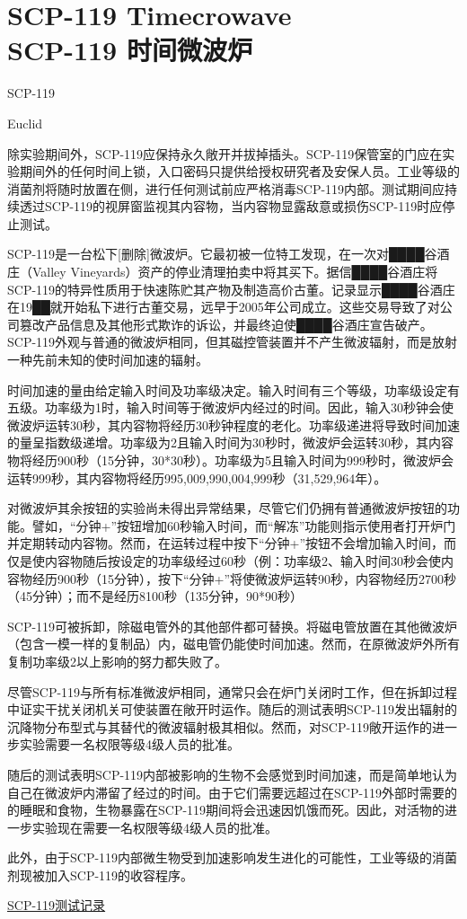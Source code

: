 \chapter[SCP-119 时间微波炉]{
    SCP-119 Timecrowave\\
    SCP-119 时间微波炉
}

\label{chap:SCP-119}

SCP-119

Euclid

除实验期间外，SCP-119应保持永久敞开并拔掉插头。SCP-119保管室的门应在实验期间外的任何时间上锁，入口密码只提供给授权研究者及安保人员。工业等级的消菌剂将随时放置在侧，进行任何测试前应严格消毒SCP-119内部。测试期间应持续透过SCP-119的视屏窗监视其内容物，当内容物显露敌意或损伤SCP-119时应停止测试。

SCP-119是一台松下{[}删除]微波炉。它最初被一位特工发现，在一次对████谷酒庄（Valley Vineyards）资产的停业清理拍卖中将其买下。据信████谷酒庄将SCP-119的特异性质用于快速陈贮其产物及制造高价古董。记录显示████谷酒庄在19██就开始私下进行古董交易，远早于2005年公司成立。这些交易导致了对公司篡改产品信息及其他形式欺诈的诉讼，并最终迫使████谷酒庄宣告破产。SCP-119外观与普通的微波炉相同，但其磁控管装置并不产生微波辐射，而是放射一种先前未知的使时间加速的辐射。

时间加速的量由给定输入时间及功率级决定。输入时间有三个等级，功率级设定有五级。功率级为1时，输入时间等于微波炉内经过的时间。因此，输入30秒钟会使微波炉运转30秒，其内容物将经历30秒钟程度的老化。功率级递进将导致时间加速的量呈指数级递增。功率级为2且输入时间为30秒时，微波炉会运转30秒，其内容物将经历900秒（15分钟，30*30秒）。功率级为5且输入时间为999秒时，微波炉会运转999秒，其内容物将经历995,009,990,004,999秒（31,529,964年）。

对微波炉其余按钮的实验尚未得出异常结果，尽管它们仍拥有普通微波炉按钮的功能。譬如，“分钟+”按钮增加60秒输入时间，而“解冻”功能则指示使用者打开炉门并定期转动内容物。然而，在运转过程中按下“分钟+”按钮不会增加输入时间，而仅是使内容物随后按设定的功率级经过60秒（例：功率级2、输入时间30秒会使内容物经历900秒（15分钟），按下“分钟+”将使微波炉运转90秒，内容物经历2700秒（45分钟）；而不是经历8100秒（135分钟，90*90秒）

SCP-119可被拆卸，除磁电管外的其他部件都可替换。将磁电管放置在其他微波炉（包含一模一样的复制品）内，磁电管仍能使时间加速。然而，在原微波炉外所有复制功率级2以上影响的努力都失败了。

尽管SCP-119与所有标准微波炉相同，通常只会在炉门关闭时工作，但在拆卸过程中证实干扰关闭机关可使装置在敞开时运作。随后的测试表明SCP-119发出辐射的沉降物分布型式与其替代的微波辐射极其相似。然而，对SCP-119敞开运作的进一步实验需要一名权限等级4级人员的批准。

随后的测试表明SCP-119内部被影响的生物不会感觉到时间加速，而是简单地认为自己在微波炉内滞留了经过的时间。由于它们需要远超过在SCP-119外部时需要的的睡眠和食物，生物暴露在SCP-119期间将会迅速因饥饿而死。因此，对活物的进一步实验现在需要一名权限等级4级人员的批准。

此外，由于SCP-119内部微生物受到加速影响发生进化的可能性，工业等级的消菌剂现被加入SCP-119的收容程序。

\hyperref[sec:DOC-test-log-for-scp-119]{SCP-119测试记录}

\newpage

